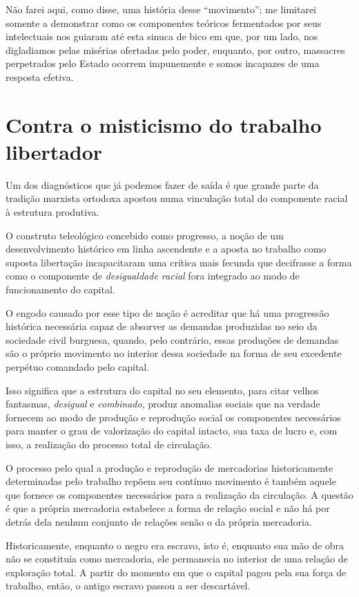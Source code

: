 Não farei aqui, como disse, uma história desse ``movimento''; me
limitarei somente a demonstrar como os componentes teóricos fermentados
por seus intelectuais nos guiaram até esta sinuca de bico em que, por um
lado, nos digladiamos pelas misérias ofertadas pelo poder, enquanto, por
outro, massacres perpetrados pelo Estado ocorrem impunemente e somos
incapazes de uma resposta efetiva.

\chapter{Contra o misticismo do trabalho libertador}

Um dos diagnósticos que já
podemos fazer de saída é que grande parte da tradição marxista ortodoxa
apostou numa vinculação total do componente racial à estrutura
produtiva.

O construto teleológico concebido como progresso, a noção de um
desenvolvimento histórico em linha ascendente e a aposta no trabalho
como suposta libertação incapacitaram uma crítica mais fecunda que
decifrasse a forma como o componente de \emph{desigualdade racial} fora
integrado ao modo de funcionamento do capital.

O engodo causado por esse tipo de noção é acreditar que há uma
progressão histórica necessária capaz de absorver as demandas produzidas
no seio da sociedade civil burguesa, quando, pelo contrário, essas
produções de demandas são o próprio movimento no interior dessa
sociedade na forma de seu excedente perpétuo comandado pelo capital.

Isso significa que a estrutura do capital no seu elemento, para citar
velhos fantasmas, \emph{desigual} e \emph{combinado}, produz anomalias
sociais que na verdade fornecem ao modo de produção e reprodução social
os componentes necessários para manter o grau de valorização do capital
intacto, sua taxa de lucro e, com isso, a realização do processo total
de circulação.

O processo pelo qual a produção e reprodução de mercadorias
historicamente determinadas pelo trabalho repõem seu contínuo movimento
é também aquele que fornece os componentes necessários para a realização
da circulação. A questão é que a
própria mercadoria estabelece a forma de relação social e não há por
detrás dela nenhum conjunto de relações senão o da própria mercadoria.

Historicamente, enquanto o negro era escravo, isto é, enquanto sua mão
de obra não se constituía como mercadoria, ele permanecia no interior de
uma relação de exploração total. A partir do momento em que o capital
pagou pela sua força de trabalho, então, o antigo escravo passou a ser
descartável.

